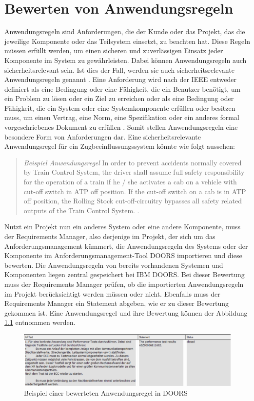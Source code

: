 \chapter{Bewerten von Anwendungsregeln}
\label{chap:kapitel2}

Anwendungsregeln sind Anforderungen, die der Kunde oder das Projekt, das die jeweilige Komponente oder das Teilsystem einsetzt, zu beachten hat. 
Diese Regeln müssen erfüllt werden, um einen sicheren und zuverlässigen Einsatz jeder Komponente im System zu gewährleisten. 
Dabei können Anwendungsregeln auch sicherheitsrelevant sein. Ist dies der Fall, werden sie auch sicherheitsrelevante Anwendungsregeln genannt \cite[S.9]{q2}. Eine Anforderung wird nach der 
IEEE entweder definiert als eine Bedingung oder eine Fähigkeit, die ein Benutzer benötigt, um ein Problem zu lösen oder ein Ziel zu erreichen oder als eine Bedingung oder Fähigkeit, 
die ein System oder eine Systemkomponente erfüllen oder besitzen muss, um einen Vertrag, eine Norm, eine Spezifikation oder ein anderes formal vorgeschriebenes Dokument 
zu erfüllen \cite[S.62]{q4}. Somit stellen Anwendungsregeln eine besondere Form von Anforderungen dar. Eine sicherheitsrelevante Anwendungsregel 
für ein Zugbeeinflussungssystem könnte wie folgt aussehen:

\begin{quotation}
	\textit{Beispiel Anwendungsregel} \glqq In order to prevent accidents normally covered by Train Control System, the driver shall assume full safety responsibility for the operation of a train if he / she activates a cab on a vehicle 
    with cut-off switch in \glqq ATP off\grqq{} position. If the cut-off switch on a cab is in \glqq ATP off\grqq{} position, the Rolling Stock cut-off-circuitry bypasses all safety related outputs of the 
    Train Control System.\grqq{} \cite[S.7]{q1}.
\end{quotation}

Nutzt ein Projekt nun ein anderes System oder eine andere Komponente, muss der Requirements Manager, also derjenige im Projekt, der sich um das Anforderungsmanagement kümmert, 
die Anwendungsregeln des Systems oder der Komponente im Anforderungsmanagement-Tool \acs*{DOORS} importieren und diese bewerten. Die Anwendungsregeln von bereits vorhandenen Systemen 
und Komponenten liegen zentral gespeichert bei IBM \acs{DOORS}. Bei dieser Bewertung muss der Requirements Manager prüfen, ob die importierten Anwendungsregeln im Projekt berücksichtigt 
werden müssen oder nicht. Ebenfalls muss der Requirements Manager ein Statement abgeben, wie er zu dieser Bewertung gekommen ist. Eine Anwendungsregel und ihre Bewertung können der 
Abbildung \ref*{fig:Bewertete Anwendungsregel} entnommen werden.

\begin{figure}[h]
    \centering
    \includegraphics[width = \textwidth]{abbildungen/Bewertete Anwendungsregel.PNG}
    \caption{Beispiel einer bewerteten Anwendungsregel in \acs{DOORS}}
    \label{fig:Bewertete Anwendungsregel}
\end{figure}